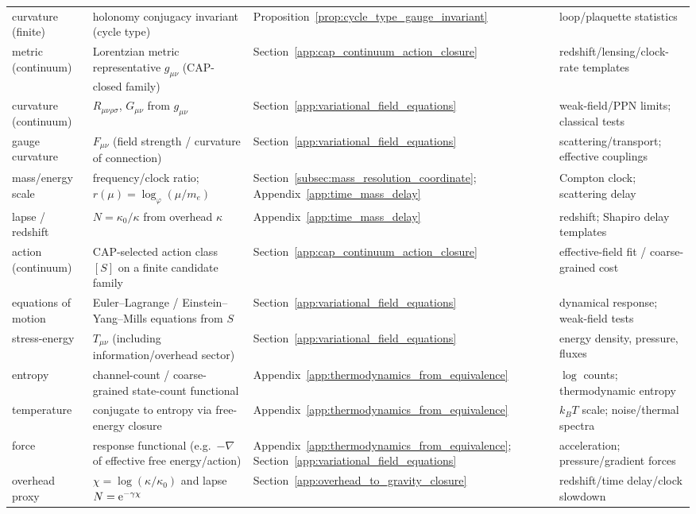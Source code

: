 \begin{longtable}{p{} p{} p{} p{}}
curvature (finite) & holonomy conjugacy invariant (cycle type) & Proposition~\ref{prop:cycle_type_gauge_invariant} & loop/plaquette statistics \\
metric (continuum) & Lorentzian metric representative $g_{\mu\nu}$ (CAP-closed family) & Section~\ref{app:cap_continuum_action_closure} & redshift/lensing/clock-rate templates \\
curvature (continuum) & $R_{\mu\nu\rho\sigma}$, $G_{\mu\nu}$ from $g_{\mu\nu}$ & Section~\ref{app:variational_field_equations} & weak-field/PPN limits; classical tests \\
gauge curvature & $F_{\mu\nu}$ (field strength / curvature of connection) & Section~\ref{app:variational_field_equations} & scattering/transport; effective couplings \\
mass/energy scale & frequency/clock ratio; $r(\mu)=\log_\varphi(\mu/m_e)$ & Section~\ref{subsec:mass_resolution_coordinate}; Appendix~\ref{app:time_mass_delay} & Compton clock; scattering delay \\
lapse / redshift & $N=\kappa_0/\kappa$ from overhead $\kappa$ & Appendix~\ref{app:time_mass_delay} & redshift; Shapiro delay templates \\
action (continuum) & CAP-selected action class $[S]$ on a finite candidate family & Section~\ref{app:cap_continuum_action_closure} & effective-field fit / coarse-grained cost \\
equations of motion & Euler--Lagrange / Einstein--Yang--Mills equations from $S$ & Section~\ref{app:variational_field_equations} & dynamical response; weak-field tests \\
stress-energy & $T_{\mu\nu}$ (including information/overhead sector) & Section~\ref{app:variational_field_equations} & energy density, pressure, fluxes \\
entropy & channel-count / coarse-grained state-count functional & Appendix~\ref{app:thermodynamics_from_equivalence} & $\log$ counts; thermodynamic entropy \\
temperature & conjugate to entropy via free-energy closure & Appendix~\ref{app:thermodynamics_from_equivalence} & $k_BT$ scale; noise/thermal spectra \\
force & response functional (e.g.\ $-\nabla$ of effective free energy/action) & Appendix~\ref{app:thermodynamics_from_equivalence}; Section~\ref{app:variational_field_equations} & acceleration; pressure/gradient forces \\
overhead proxy & $\chi=\log(\kappa/\kappa_0)$ and lapse $N=\mathrm{e}^{-\gamma\chi}$ & Section~\ref{app:overhead_to_gravity_closure} & redshift/time delay/clock slowdown \\

\end{longtable}
